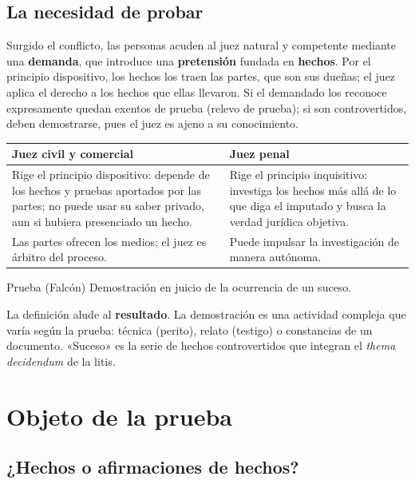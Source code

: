 \documentclass[12pt,oneside]{book}
\renewcommand{\arraystretch}{1.15}
\begin{document}
\subsection{La necesidad de probar}

Surgido el conflicto, las personas acuden al juez natural y competente mediante una \textbf{demanda}, que introduce una \textbf{pretensión} fundada en \textbf{hechos}. Por el principio dispositivo, los hechos los traen las partes, que son sus dueñas; el juez aplica el derecho a los hechos que ellas llevaron. Si el demandado los reconoce expresamente quedan exentos de prueba (relevo de prueba); si son controvertidos, deben demostrarse, pues el juez es ajeno a su conocimiento.

\begin{table}[H]
\centering
\renewcommand{\arraystretch}{1.25}
\begin{tabularx}{\textwidth}{>{\RaggedRight\arraybackslash}X>{\RaggedRight\arraybackslash}X}
\toprule
\textbf{Juez civil y comercial} & \textbf{Juez penal} \\
\midrule
Rige el principio dispositivo: depende de los hechos y pruebas aportados por las partes; no puede usar su saber privado, aun si hubiera presenciado un hecho. & Rige el principio inquisitivo: investiga los hechos más allá de lo que diga el imputado y busca la verdad jurídica objetiva. \\
Las partes ofrecen los medios; el juez es árbitro del proceso. & Puede impulsar la investigación de manera autónoma. \\
\bottomrule
\end{tabularx}
\end{table}

\begin{definicion}{Prueba (Falcón)}
Demostración en juicio de la ocurrencia de un suceso.
\end{definicion}

La definición alude al \textbf{resultado}. La demostración es una actividad compleja que varía según la prueba: técnica (perito), relato (testigo) o constancias de un documento. «Suceso» es la serie de hechos controvertidos que integran el \textit{thema decidendum} de la litis.

\section{Objeto de la prueba}

\subsection{¿Hechos o afirmaciones de hechos?}
\end{document}
